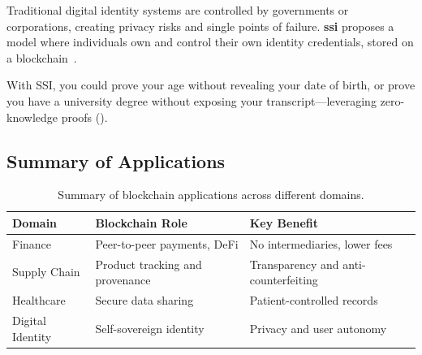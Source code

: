 Traditional digital identity systems are controlled by governments or corporations, creating privacy risks and single points of failure. \textbf{\Gls{ssi}} proposes a model where individuals own and control their own identity credentials, stored on a blockchain~\cite{allen2016ssi}.

With SSI, you could prove your age without revealing your date of birth, or prove you have a university degree without exposing your transcript---leveraging zero-knowledge proofs ().

\subsection{Summary of Applications}

\begin{table}[htbp]
\centering
\renewcommand{\arraystretch}{1.3}
\begin{tabularx}{\textwidth}{l X X}
\toprule
\textbf{Domain} & \textbf{Blockchain Role} & \textbf{Key Benefit} \\
\midrule
Finance          & Peer-to-peer payments, DeFi     & No intermediaries, lower fees \\
Supply Chain     & Product tracking and provenance  & Transparency and anti-counterfeiting \\
Healthcare       & Secure data sharing              & Patient-controlled records \\
Digital Identity & Self-sovereign identity          & Privacy and user autonomy \\
\bottomrule
\end{tabularx}
\caption{Summary of blockchain applications across different domains.}
\label{tab:applications}
\end{table}
